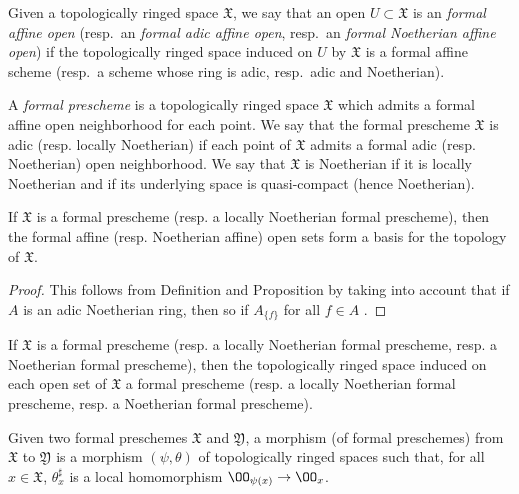 \begin{env}[10.4.1]
\label{1.10.4.1}
Given a topologically ringed space $\mathfrak{X}$, we say that an open $U\subset\mathfrak{X}$ is an \emph{formal affine open} (resp.~an \emph{formal adic affine open}, resp.~an \emph{formal Noetherian affine open}) if the topologically ringed space induced on $U$ by $\mathfrak{X}$ is a formal affine scheme (resp.~a scheme whose ring is adic, resp.~adic and Noetherian).
\end{env}

\begin{defn}[10.4.2]
\label{1.10.4.2}
A \emph{formal prescheme} is a topologically ringed space $\mathfrak{X}$ which admits a formal affine open neighborhood for each point.
We say that the formal prescheme $\mathfrak{X}$ is adic (resp. locally Noetherian) if each point of $\mathfrak{X}$ admits a formal adic (resp. Noetherian) open neighborhood.
We say that $\mathfrak{X}$ is Noetherian if it is locally Noetherian and if its underlying space is quasi-compact (hence Noetherian).
\end{defn}

\begin{prop}[10.4.3]
\label{1.10.4.3}
If $\mathfrak{X}$ is a formal prescheme (resp. a locally Noetherian formal prescheme), then the formal affine (resp. Noetherian affine) open sets form a basis for the topology of $\mathfrak{X}$.
\end{prop}

\begin{proof}
\label{proof-1.10.4.3}
This follows from Definition  and Proposition  by taking into account that if $A$ is an adic Noetherian ring, then so if $A_{\{f\}}$ for all $f\in A$ .
\end{proof}

\begin{cor}[10.4.4]
\label{1.10.4.4}
If $\mathfrak{X}$ is a formal prescheme (resp. a locally Noetherian formal prescheme, resp. a Noetherian formal prescheme), then the topologically ringed space induced on each open set of $\mathfrak{X}$ a formal prescheme (resp. a locally Noetherian formal prescheme, resp. a Noetherian formal prescheme).
\end{cor}

\begin{defn}[10.4.5]
\label{1.10.4.5}
Given two formal preschemes $\mathfrak{X}$ and $\mathfrak{Y}$, a morphism (of formal preschemes) from $\mathfrak{X}$ to $\mathfrak{Y}$ is a morphism $(\psi,\theta)$ of topologically ringed spaces such that, for all $x\in\mathfrak{X}$, $\theta_x^\sharp$ is a local homomorphism $\OO_{\psi(x)}\to\OO_x$.
\end{defn}

